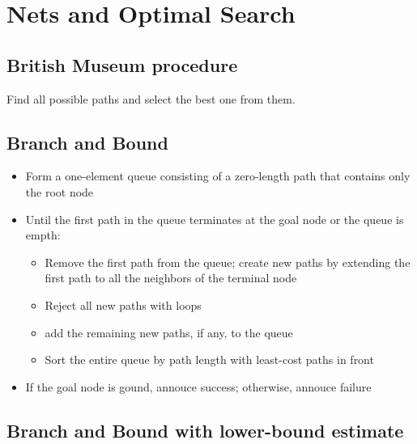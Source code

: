 \documentclass{article}
\begin{document}
\section{Nets and Optimal Search}

\subsection{British Museum procedure}

Find all possible paths and select the best one from them.

\subsection{Branch and Bound}

\begin{itemize}
  \item Form a one-element queue consisting of a zero-length path 
    that contains only the root node
  \item Until the first path in the queue terminates at the 
    goal node or the queue is empth:
    \begin{itemize}
      \item Remove the first path from the queue; create new paths 
        by extending the first path to all the neighbors
        of the terminal node
      \item Reject all new paths with loops
      \item add the remaining new paths, if any, to the queue
      \item Sort the entire queue by path length with 
        least-cost paths in front
    \end{itemize}
  \item If the goal node is gound, annouce success; otherwise, 
    annouce failure
\end{itemize}

\subsection{Branch and Bound with lower-bound estimate}
\end{document}
